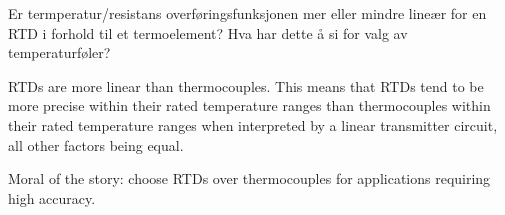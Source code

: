 

Er termperatur/resistans overføringsfunksjonen mer eller mindre lineær for en RTD i forhold til et termoelement? Hva har dette å si for valg av temperaturføler?







RTDs are more linear than thermocouples.  This means that RTDs tend to be more precise within their rated temperature ranges than thermocouples within their rated temperature ranges when interpreted by a linear transmitter circuit, all other factors being equal. 







Moral of the story: choose RTDs over thermocouples for applications requiring high accuracy.




